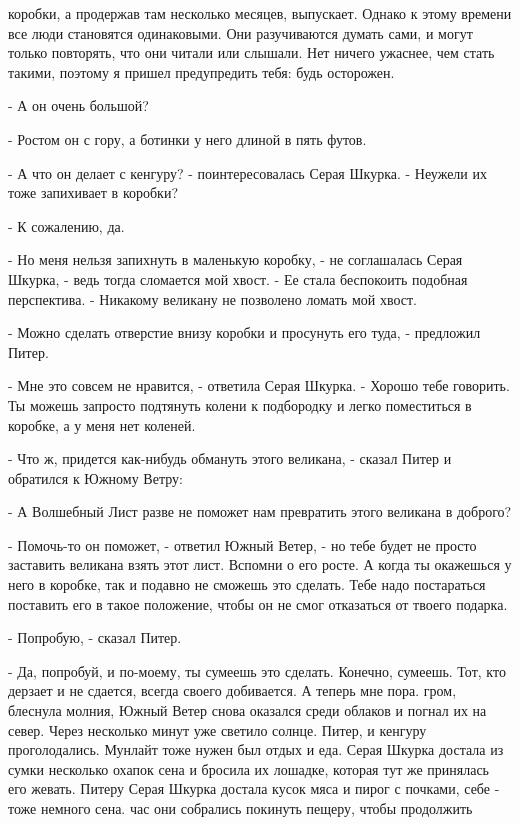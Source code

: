коробки, а продержав там несколько месяцев, выпускает. Однако к этому 
времени все люди становятся одинаковыми. Они разучиваются думать сами, 
и могут только повторять, что они читали или слышали. Нет ничего 
ужаснее, чем стать такими, поэтому я пришел предупредить тебя: будь 
осторожен.
\par- А он очень большой?
\par- Ростом он с гору, а ботинки у него длиной в пять футов.
\par- А что он делает с кенгуру? - поинтересовалась Серая Шкурка. - 
Неужели их тоже запихивает в коробки?
\par- К сожалению, да.
\par- Но меня нельзя запихнуть в маленькую коробку, - не соглашалась 
Серая Шкурка, - ведь тогда сломается мой хвост. - Ее стала беспокоить 
подобная перспектива. - Никакому великану не позволено ломать мой 
хвост.
\par- Можно сделать отверстие внизу коробки и просунуть его туда, - 
предложил Питер.
\par- Мне это совсем не нравится, - ответила Серая Шкурка. - Хорошо 
тебе говорить. Ты можешь запросто подтянуть колени к подбородку и 
легко поместиться в коробке, а у меня нет коленей.
\par- Что ж, придется как-нибудь обмануть этого великана, - сказал 
Питер и обратился к Южному Ветру:
\par- А Волшебный Лист разве не поможет нам превратить этого великана 
в доброго?
\par- Помочь-то он поможет, - ответил Южный Ветер, - но тебе будет не 
просто заставить великана взять этот лист. Вспомни о его росте. А 
когда ты окажешься у него в коробке, так и подавно не сможешь это 
сделать. Тебе надо постараться поставить его в такое положение, чтобы 
он не смог отказаться от твоего подарка.
\par- Попробую, - сказал Питер.
\par- Да, попробуй, и по-моему, ты сумеешь это сделать. Конечно, 
сумеешь. Тот, кто дерзает и не сдается, всегда своего добивается. А 
теперь мне пора.
 гром, блеснула молния, Южный Ветер снова оказался среди 
облаков и погнал их на север. Через несколько минут уже светило 
солнце.
 Питер, и кенгуру проголодались. Мунлайт тоже нужен был отдых и 
еда. Серая Шкурка достала из сумки несколько охапок сена и бросила их 
лошадке, которая тут же принялась его жевать. Питеру Серая Шкурка 
достала кусок мяса и пирог с почками, себе - тоже немного сена.
 час они собрались покинуть пещеру, чтобы продолжить 
